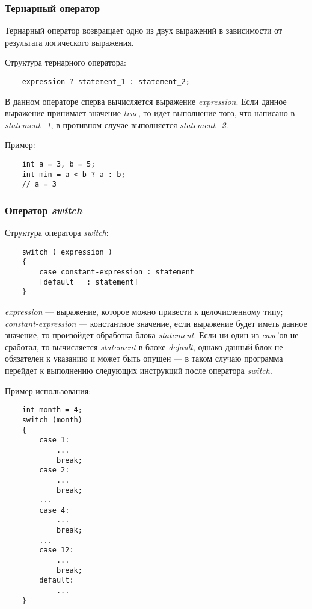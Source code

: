 \subsubsection{Тернарный оператор}
\label{subsubsec:ternaryOperator}
Тернарный оператор возвращает одно из двух выражений в зависимости от результата логического выражения.

Структура тернарного оператора:

\begin{lstlisting}
    expression ? statement_1 : statement_2;
\end{lstlisting}

В данном операторе сперва вычисляется выражение \textit{expression}. Если данное выражение принимает значение \textit{true}, то идет выполнение того, что написано в \textit{statement\_1}, в противном случае выполняется \textit{statement\_2}.

Пример:
\begin{lstlisting}
    int a = 3, b = 5;
    int min = a < b ? a : b;
    // a = 3
\end{lstlisting}

\subsubsection{Оператор \textit{switch}}
Структура оператора \textit{switch}:
\begin{lstlisting}
    switch ( expression )
    {
        case constant-expression : statement
        [default   : statement]
    }
\end{lstlisting}

\textit{expression} --- выражение, которое можно привести к целочисленному типу; \textit{constant-expression} --- константное значение, если выражение будет иметь данное значение, то произойдет обработка блока \textit{statement}. Если ни один из \textit{case}'ов не сработал, то вычисляется \textit{statement} в блоке \textit{default}, однако данный блок не обязателен к указанию и может быть опущен --- в таком случаю программа перейдет к выполнению следующих инструкций после оператора \textit{switch}.

Пример использования:
\begin{lstlisting}
    int month = 4;
    switch (month)
    {
        case 1:
            ...
            break;
        case 2:
            ...
            break;
        ...
        case 4:
            ...
            break;
        ...
        case 12:
            ...
            break;
        default:
            ...
    }
\end{lstlisting}


